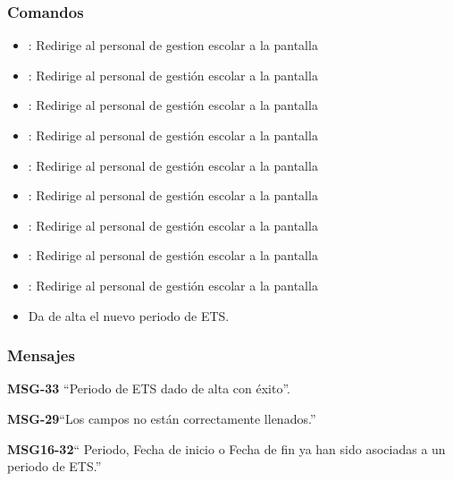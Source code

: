 \subsubsection{Comandos}
\begin{itemize}
	\item {}: Redirige al personal de gestion escolar a la pantalla 
	
	\item {}: Redirige al personal de gestión escolar a la pantalla 
	\item {}: Redirige al personal de gestión escolar a la pantalla 
	
	\item {}: Redirige al personal de gestión escolar a la pantalla 
	\item {}: Redirige al personal de gestión escolar a la pantalla 
	
	\item {}: Redirige al personal de gestión escolar a la pantalla 
	\item {}: Redirige al personal de gestión escolar a la pantalla 
	
	\item {}: Redirige al personal de gestión escolar a la pantalla 
	\item {}: Redirige al personal de gestión escolar a la pantalla 
	
    \item {} Da de alta el nuevo periodo de ETS.
    
\end{itemize}

\subsubsection{Mensajes}

\begin{Citemize}
    \item {\bf MSG-33} ``Periodo de ETS  dado de alta con éxito''.
    \item {\bf MSG-29}{``Los campos no están correctamente llenados.''}
    \item {\bf MSG16-32}{`` Periodo, Fecha de inicio o Fecha de fin ya han sido asociadas a un periodo de ETS.''}
\end{Citemize}

